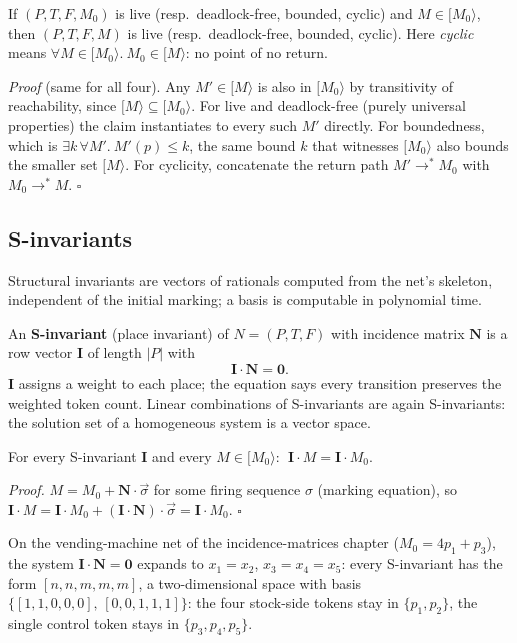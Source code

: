 \begin{lemma}
If $(P, T, F, M_0)$ is live (resp.\ deadlock-free, bounded, cyclic) and $M \in [M_0\rangle$, then $(P, T, F, M)$ is live (resp.\ deadlock-free, bounded, cyclic). Here \emph{cyclic} means $\forall M \in [M_0\rangle.\ M_0 \in [M\rangle$: no point of no return.
\end{lemma}
\textit{Proof} (same for all four). Any $M' \in [M\rangle$ is also in $[M_0\rangle$ by transitivity of reachability, since $[M\rangle \subseteq [M_0\rangle$. For live and deadlock-free (purely universal properties) the claim instantiates to every such $M'$ directly. For boundedness, which is $\exists k\, \forall M'.\ M'(p) \leq k$, the same bound $k$ that witnesses $[M_0\rangle$ also bounds the smaller set $[M\rangle$. For cyclicity, concatenate the return path $M' \to^\ast M_0$ with $M_0 \to^\ast M$. \hfill$\square$

\subsection{S-invariants}

Structural invariants are vectors of rationals computed from the net's skeleton, independent of the initial marking; a basis is computable in polynomial time.

\begin{definition}[S-invariant]
An \textbf{S-invariant} (place invariant) of $N = (P, T, F)$ with incidence matrix $\mathbf{N}$ is a row vector $\mathbf{I}$ of length $|P|$ with
\[
  \mathbf{I} \cdot \mathbf{N} = \mathbf{0}.
\]
$\mathbf{I}$ assigns a weight to each place; the equation says every transition preserves the weighted token count. Linear combinations of S-invariants are again S-invariants: the solution set of a homogeneous system is a vector space.
\end{definition}

\begin{proposition}
For every S-invariant $\mathbf{I}$ and every $M \in [M_0\rangle$: $\;\mathbf{I} \cdot M = \mathbf{I} \cdot M_0$.
\end{proposition}

\textit{Proof.} $M = M_0 + \mathbf{N} \cdot \vec{\sigma}$ for some firing sequence $\sigma$ (marking equation), so $\mathbf{I} \cdot M = \mathbf{I} \cdot M_0 + (\mathbf{I} \cdot \mathbf{N}) \cdot \vec{\sigma} = \mathbf{I} \cdot M_0$. \hfill$\square$

On the vending-machine net of the incidence-matrices chapter ($M_0 = 4p_1 + p_3$), the system $\mathbf{I} \cdot \mathbf{N} = \mathbf{0}$ expands to $x_1 = x_2$, $x_3 = x_4 = x_5$: every S-invariant has the form $[n, n, m, m, m]$, a two-dimensional space with basis $\{[1,1,0,0,0],\, [0,0,1,1,1]\}$: the four stock-side tokens stay in $\{p_1, p_2\}$, the single control token stays in $\{p_3, p_4, p_5\}$.

